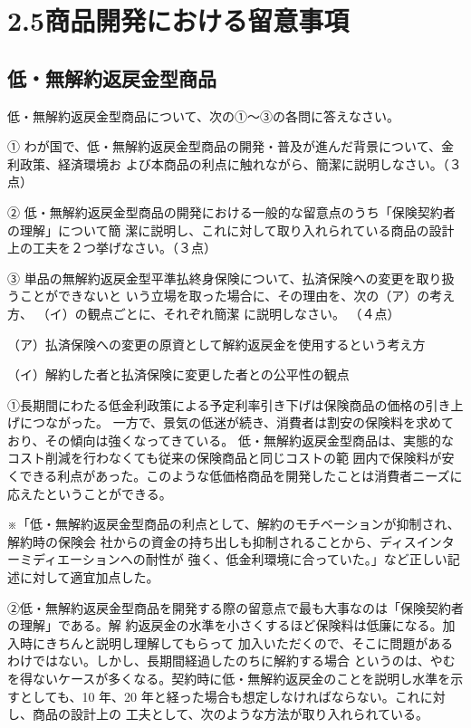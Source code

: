 \documentclass[report,gutter=10mm,fore-edge=10mm,uplatex,dvipdfmx]{jlreq}
\begin{document}
\section{2.5商品開発における留意事項}

\subsection{低・無解約返戻金型商品}

低・無解約返戻金型商品について、次の①～③の各問に答えなさい。

① わが国で、低・無解約返戻金型商品の開発・普及が進んだ背景について、金利政策、経済環境お
よび本商品の利点に触れながら、簡潔に説明しなさい。（３点）

② 低・無解約返戻金型商品の開発における一般的な留意点のうち「保険契約者の理解」について簡
潔に説明し、これに対して取り入れられている商品の設計上の工夫を２つ挙げなさい。（３点）

③ 単品の無解約返戻金型平準払終身保険について、払済保険への変更を取り扱うことができないと
いう立場を取った場合に、その理由を、次の（ア）の考え方、
（イ）の観点ごとに、それぞれ簡潔
に説明しなさい。
（４点）

（ア）払済保険への変更の原資として解約返戻金を使用するという考え方

（イ）解約した者と払済保険に変更した者との公平性の観点

①長期間にわたる低金利政策による予定利率引き下げは保険商品の価格の引き上げにつながった。
一方で、景気の低迷が続き、消費者は割安の保険料を求めており、その傾向は強くなってきている。
低・無解約返戻金型商品は、実態的なコスト削減を行わなくても従来の保険商品と同じコストの範
囲内で保険料が安くできる利点があった。このような低価格商品を開発したことは消費者ニーズに
応えたということができる。

※「低・無解約返戻金型商品の利点として、解約のモチベーションが抑制され、解約時の保険会
社からの資金の持ち出しも抑制されることから、ディスインターミディエーションへの耐性が
強く、低金利環境に合っていた。」など正しい記述に対して適宜加点した。

②低・無解約返戻金型商品を開発する際の留意点で最も大事なのは「保険契約者の理解」である。解
約返戻金の水準を小さくするほど保険料は低廉になる。加入時にきちんと説明し理解してもらって
加入いただくので、そこに問題があるわけではない。しかし、長期間経過したのちに解約する場合
というのは、やむを得ないケースが多くなる。契約時に低・無解約返戻金のことを説明し水準を示
すとしても、10 年、20 年と経った場合も想定しなければならない。これに対し、商品の設計上の
工夫として、次のような方法が取り入れられている。
\end{document}
